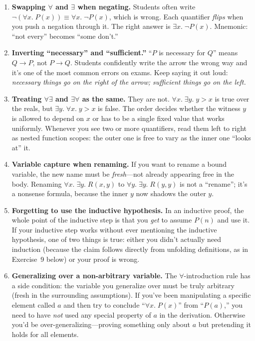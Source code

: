 \documentclass[11pt]{article}
\begin{document}
\begin{enumerate}
  \item \textbf{Swapping $\forall$ and $\exists$ when negating.} Students often write $\lnot (\forall x.\; P(x)) \equiv \forall x.\; \lnot P(x)$, which is wrong. Each quantifier \emph{flips} when you push a negation through it. The right answer is $\exists x.\; \lnot P(x)$. Mnemonic: ``not every'' becomes ``some don't.''
  \item \textbf{Inverting ``necessary'' and ``sufficient.''} ``$P$ is necessary for $Q$'' means $Q \to P$, not $P \to Q$. Students confidently write the arrow the wrong way and it's one of the most common errors on exams. Keep saying it out loud: \emph{necessary things go on the right of the arrow; sufficient things go on the left.}
  \item \textbf{Treating $\forall\exists$ and $\exists\forall$ as the same.} They are not. $\forall x.\;\exists y.\; y > x$ is true over the reals, but $\exists y.\;\forall x.\; y > x$ is false. The order decides whether the witness $y$ is allowed to depend on $x$ or has to be a single fixed value that works uniformly. Whenever you see two or more quantifiers, read them left to right as nested function scopes: the outer one is free to vary as the inner one ``looks at'' it.
  \item \textbf{Variable capture when renaming.} If you want to rename a bound variable, the new name must be \emph{fresh}---not already appearing free in the body. Renaming $\forall x.\; \exists y.\; R(x, y)$ to $\forall y.\; \exists y.\; R(y, y)$ is not a ``rename''; it's a nonsense formula, because the inner $y$ now shadows the outer $y$.
  \item \textbf{Forgetting to use the inductive hypothesis.} In an inductive proof, the whole point of the inductive step is that you \emph{get} to assume $P(n)$ and use it. If your inductive step works without ever mentioning the inductive hypothesis, one of two things is true: either you didn't actually need induction (because the claim follows directly from unfolding definitions, as in Exercise~9 below) or your proof is wrong.
  \item \textbf{Generalizing over a non-arbitrary variable.} The $\forall$-introduction rule has a side condition: the variable you generalize over must be truly arbitrary (fresh in the surrounding assumptions). If you've been manipulating a specific element called $a$ and then try to conclude ``$\forall x.\; P(x)$'' from ``$P(a)$,'' you need to have \emph{not} used any special property of $a$ in the derivation. Otherwise you'd be over-generalizing---proving something only about $a$ but pretending it holds for all elements.
\end{enumerate}
\end{document}
